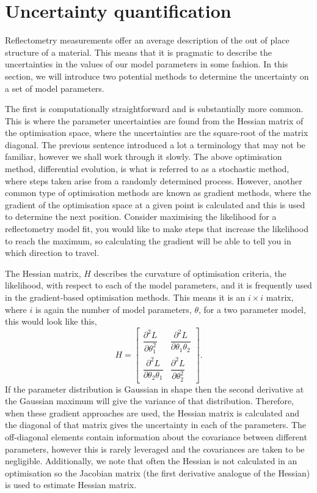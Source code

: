 \documentclass[
 reprint,
 superscriptaddress,
 amsmath,amssymb,
 aps,
]{revtex4-1}
\begin{document}
\section{Uncertainty quantification}
Reflectometry measurements offer an average description of the out of place structure of a material. 
This means that it is pragmatic to describe the uncertainties in the values of our model parameters in some fashion.
In this section, we will introduce two potential methods to determine the uncertainty on a set of model parameters. 

The first is computationally straightforward and is substantially more common. 
This is where the parameter uncertainties are found from the Hessian matrix of the optimisation space, where the uncertainties are the square-root of the matrix diagonal. 
The previous sentence introduced a lot a terminology that may not be familiar, however we shall work through it slowly. 
The above optimisation method, differential evolution, is what is referred to as a stochastic method, where steps taken arise from a randomly determined process. 
However, another common type of optimisation methods are known as gradient methods, where the gradient of the optimisation space at a given point is calculated and this is used to determine the next position. 
Consider maximising the likelihood for a reflectometry model fit, you would like to make steps that increase the likelihood to reach the maximum, so calculating the gradient will be able to tell you in which direction to travel. 

The Hessian matrix, $H$ describes the curvature of optimisation criteria, the likelihood, with respect to each of the model parameters, and it is frequently used in the gradient-based optimisation methods. 
This means it is an $i\times i$ matrix, where $i$ is again the number of model parameters, $\theta$, for a two parameter model, this would look like this,
%
\begin{equation}
    H = 
    \left[\begin{matrix}
        \dfrac{\partial^2 L}{\partial \theta_{1}^2} & \dfrac{\partial^2 L}{\partial \theta_1 \theta_2} \\[6pt]
        \dfrac{\partial^2 L}{\partial \theta_2 \theta_1} & \dfrac{\partial^2 L}{\partial \theta_{2}^2}
    \end{matrix}\right].
\end{equation}
%
If the parameter distribution is Gaussian in shape then the second derivative at the Gaussian maximum will give the variance of that distribution. 
Therefore, when these gradient approaches are used, the Hessian matrix is calculated and the diagonal of that matrix gives the uncertainty in each of the parameters. 
The off-diagonal elements contain information about the covariance between different parameters, however this is rarely leveraged and the covariances are taken to be negligible. 
Additionally, we note that often the Hessian is not calculated in an optimisation so the Jacobian matrix (the first derivative analogue of the Hessian) is used to estimate Hessian matrix. 
\end{document}
